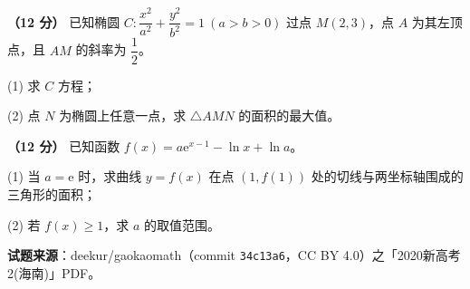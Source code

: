 \begin{question}
\textbf{（12 分）} 已知椭圆 $C:\dfrac{x^{2}}{a^{2}}+\dfrac{y^{2}}{b^{2}}=1\ (a>b>0)$ 过点 $M(2,3)$，点 $A$ 为其左顶点，且 $AM$ 的斜率为 $\dfrac12$。

  (1) 求 $C$ 方程；

  (2) 点 $N$ 为椭圆上任意一点，求 $\triangle AMN$ 的面积的最大值。

\end{question}
\begin{question}
\textbf{（12 分）} 已知函数 $f(x)=a\mathrm e^{x-1}-\ln x+\ln a$。

  (1) 当 $a=\mathrm e$ 时，求曲线 $y=f(x)$ 在点 $(1,f(1))$ 处的切线与两坐标轴围成的三角形的面积；

  (2) 若 $f(x)\ge1$，求 $a$ 的取值范围。

\par\medskip

\begin{gktip}
\textbf{试题来源}：deekur/gaokaomath（commit \texttt{34c13a6}，CC BY 4.0）之「2020新高考2(海南)」PDF。
\end{gktip}

\end{question}